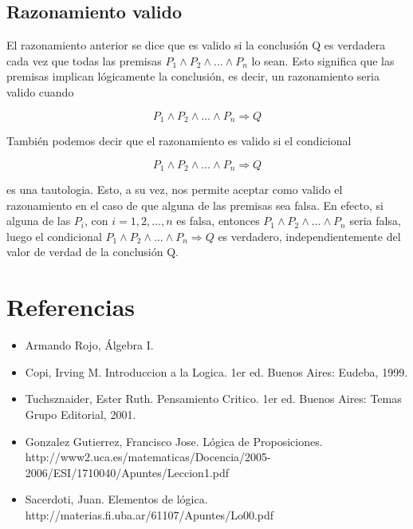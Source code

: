 \documentclass[a4paper,11pt,oneside,titlepage,final]{scrartc}
\begin{document}
\subsection{Razonamiento valido}

El razonamiento anterior se dice que es valido si la conclusión Q es verdadera cada vez que todas las premisas $P_{1} \wedge P_{2} \wedge \ldots \wedge P_{n}$ lo sean. Esto significa que las premisas implican lógicamente la conclusión, es decir, un razonamiento seria valido cuando

$$P_{1} \wedge P_{2} \wedge \ldots \wedge P_{n} \Longrightarrow Q$$

También podemos decir que el razonamiento es valido si el condicional

$$P_{1} \wedge P_{2} \wedge \ldots \wedge P_{n} \Longrightarrow Q$$

es una tautologia. Esto, a su vez, nos permite aceptar como valido el razonamiento en el caso de que alguna de las premisas sea falsa. En efecto, si alguna de las $P_{i}$, con $i=1, 2, \ldots , n$ es falsa, entonces $P_{1} \wedge P_{2} \wedge \ldots \wedge P_{n}$ seria falsa, luego el condicional $P_{1} \wedge P_{2} \wedge \ldots \wedge P_{n} \Longrightarrow Q$ es verdadero, independientemente del valor de verdad de la conclusión Q.

\newpage
\section{Referencias}

\begin{itemize}
\item Armando Rojo, Álgebra I.
\item Copi, Irving M. Introduccion a la Logica. 1er ed. Buenos Aires: Eudeba, 1999.
\item Tuchsznaider, Ester Ruth. Pensamiento Critico. 1er ed. Buenos Aires:  Temas Grupo Editorial, 2001.
\item Gonzalez Gutierrez, Francisco Jose. Lógica de Proposiciones.\\ http://www2.uca.es/matematicas/Docencia/2005-2006/ESI/1710040/Apuntes/Leccion1.pdf
\item Sacerdoti, Juan. Elementos de lógica.\\ http://materias.fi.uba.ar/61107/Apuntes/Lo00.pdf
\end{itemize}
\end{document}
